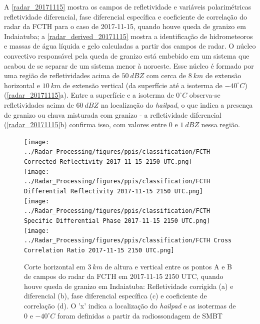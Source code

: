 A \autoref{radar_20171115} mostra os campos de refletividade e variáveis polarimétricas refletividade diferencial, fase diferencial específica e coeficiente de correlação do radar da FCTH para o caso de 2017-11-15, quando houve queda de granizo em Indaiatuba; a \autoref{radar_derived_20171115} mostra a identificação de hidrometeoros e massas de água líquida e gelo calculadas a partir dos campos de radar. O núcleo convectivo responsável pela queda de granizo está embebido em um sistema que acabou de se separar de um sistema menor à noroeste. Esse núcleo é formado por uma região de refletividades acima de $50\:dBZ$ com cerca de $8\:km$ de extensão horizontal e $10\:km$ de extensão vertical (da superfície até a isoterma de $-40^{\circ}C$) (\autoref{radar_20171115}a). Entre a superfície e a isoterma de $0^{\circ}C$ observa-se refletividades acima de $60\:dBZ$ na localização do \textit{hailpad}, o que indica a presença de granizo ou chuva misturada com granizo - a refletividade diferencial (\autoref{radar_20171115}b) confirma isso, com valores entre 0 e $1\:dBZ$ nessa região.

\begin{figure}[hp]
	\centering
	\caption{Corte horizontal em $3\:km$ de altura e vertical entre os pontos A e B de campos do radar da FCTH em 2017-11-15 2150 UTC, quando houve queda de granizo em Indaiatuba: Refletividade corrigida (a) e diferencial (b), fase diferencial específica (c) e coeficiente de correlação (d). O 'x' indica a localização do \textit{hailpad} e as isotermas de $0$ e $-40^{\circ}C$ foram definidas a partir da radiossondagem de SMBT}
	\label{radar_20171115}
	\vspace{-5pt}
	\texttt{[image: ../Radar\_Processing/figures/ppis/classification/FCTH Corrected Reflectivity 2017-11-15 2150 UTC.png]} \\
	\vspace{-5pt}
	\texttt{[image: ../Radar\_Processing/figures/ppis/classification/FCTH Differential Reflectivity 2017-11-15 2150 UTC.png]} \\
	\vspace{-5pt}
	\texttt{[image: ../Radar\_Processing/figures/ppis/classification/FCTH Specific Differential Phase 2017-11-15 2150 UTC.png]} \\
	\vspace{-5pt}
	\texttt{[image: ../Radar\_Processing/figures/ppis/classification/FCTH Cross Correlation Ratio 2017-11-15 2150 UTC.png]} \\
\end{figure}


